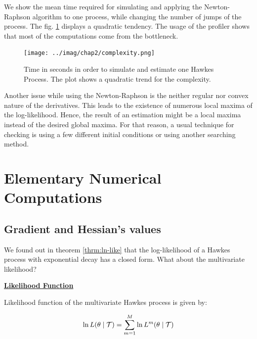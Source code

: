 \documentclass[11pt]{book}
\begin{document}
We show the mean time required for simulating and applying the Newton-Raphson algorithm to one process, while changing the number of jumps of the process. The fig. \ref{fig:complex} displays a quadratic tendency. The usage of the profiler shows that most of the computations come from the bottleneck.  

\begin{figure}
\centering
\texttt{[image: ../imag/chap2/complexity.png]}
\caption{Time in seconds in order to simulate and estimate one Hawkes Process. The plot shows a quadratic trend for the complexity.}
\label{fig:complex}
\end{figure}

Another issue while using the Newton-Raphson is the neither regular nor convex nature of the derivatives. This leads to the existence of numerous local maxima of the log-likelihood. Hence, the result of an estimation might be a local maxima instead of the desired global maxima. For that reason, a usual technique for checking is using a few different initial conditions or using another searching method.















\section{Elementary Numerical Computations}
\subsection{Gradient and Hessian's values}
\label{subsection_R_def}

We found out in theorem \ref{thrm:ln-like} that the log-likelihood of a Hawkes process with exponential decay has a closed form. What about the multivariate likelihood?

\vspace{0.6 cm}
\underline{\textbf{Likelihood Function}}

Likelihood function of the multivariate Hawkes process is given by:

\begin{equation}
\ln L( \theta \mid \mathcal{T} ) = \sum_{m = 1}^M \ln L^m( \theta \mid \mathcal{T} )
\label{eq:ln_multi}
\end{equation}
\end{document}

